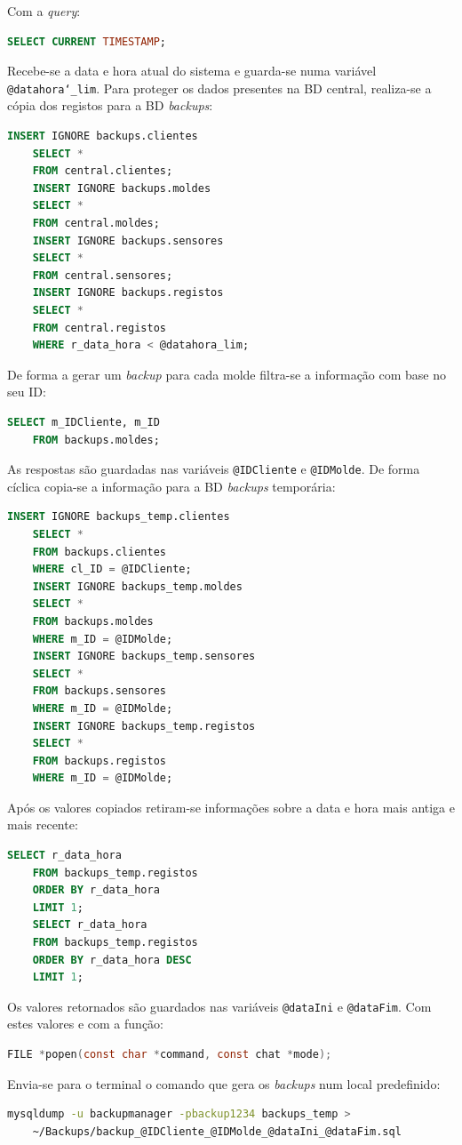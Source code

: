 \documentclass[11pt,twoside,a4paper]{report}
\begin{document}
Com a \textit{query}:
\begin{lstlisting}[language = SQL]
	SELECT CURRENT TIMESTAMP;
\end{lstlisting}
Recebe-se a data e hora atual do sistema e guarda-se numa variável \texttt{@datahora\char`_lim}. Para proteger os dados presentes na BD central, realiza-se a cópia dos registos para a BD \textit{backups}:
\begin{lstlisting}[language = SQL]
	INSERT IGNORE backups.clientes
	SELECT *
	FROM central.clientes;
	INSERT IGNORE backups.moldes
	SELECT *
	FROM central.moldes;
	INSERT IGNORE backups.sensores
	SELECT *
	FROM central.sensores;
	INSERT IGNORE backups.registos
	SELECT *
	FROM central.registos
	WHERE r_data_hora < @datahora_lim;
\end{lstlisting}
De forma a gerar um \textit{backup} para cada molde filtra-se a informação com base no seu ID:
\begin{lstlisting}[language = SQL]
	SELECT m_IDCliente, m_ID
	FROM backups.moldes;
\end{lstlisting}
As respostas são guardadas nas variáveis \texttt{@IDCliente} e \texttt{@IDMolde}. De forma cíclica copia-se a informação para a BD \textit{backups} temporária:
\begin{lstlisting}[language = SQL]
	INSERT IGNORE backups_temp.clientes
	SELECT *
	FROM backups.clientes
	WHERE cl_ID = @IDCliente;
	INSERT IGNORE backups_temp.moldes
	SELECT *
	FROM backups.moldes
	WHERE m_ID = @IDMolde;
	INSERT IGNORE backups_temp.sensores
	SELECT *
	FROM backups.sensores
	WHERE m_ID = @IDMolde;
	INSERT IGNORE backups_temp.registos
	SELECT *
	FROM backups.registos
	WHERE m_ID = @IDMolde;
\end{lstlisting}
Após os valores copiados retiram-se informações sobre a data e hora mais antiga e mais recente:
\begin{lstlisting}[language = SQL]
	SELECT r_data_hora
	FROM backups_temp.registos
	ORDER BY r_data_hora
	LIMIT 1;
	SELECT r_data_hora
	FROM backups_temp.registos
	ORDER BY r_data_hora DESC
	LIMIT 1;
\end{lstlisting}
Os valores retornados são guardados nas variáveis \texttt{@dataIni} e \texttt{@dataFim}. Com estes valores e com a função:
\begin{lstlisting}[language = C]
	FILE *popen(const char *command, const chat *mode);
\end{lstlisting}
Envia-se para o terminal o comando que gera os \textit{backups} num local predefinido:
\begin{lstlisting}[language = bash]
	mysqldump -u backupmanager -pbackup1234 backups_temp >
	~/Backups/backup_@IDCliente_@IDMolde_@dataIni_@dataFim.sql
\end{lstlisting}
\end{document}
